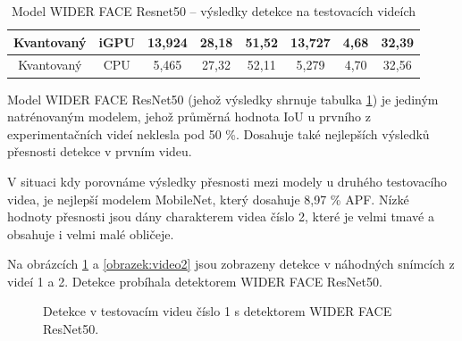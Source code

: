 \begin{table}[H]
\begin{tabular}{cc|ccc|ccc|}
  \multicolumn{1}{|c|}{\cellcolor[HTML]{E0DBDB}Kvantovaný}     & \cellcolor[HTML]{E0DBDB}iGPU & \multicolumn{1}{c|}{13,924}                                 & \multicolumn{1}{c|}{28,18}                                  & 51,52          & \multicolumn{1}{c|}{13,727}                                 & \multicolumn{1}{c|}{4,68}                                   & 32,39          \\ \hline
  \multicolumn{1}{|c|}{\cellcolor[HTML]{E0DBDB}Kvantovaný}     & \cellcolor[HTML]{E0DBDB}CPU  & \multicolumn{1}{c|}{5,465}                                  & \multicolumn{1}{c|}{27,32}                                  & 52,11          & \multicolumn{1}{c|}{5,279}                                  & \multicolumn{1}{c|}{4,70}                                   & 32,56          \\ \hline
  \end{tabular}
  \label{tabulka:wfrvidea}
  \caption{Model WIDER FACE Resnet50 -- výsledky detekce na testovacích videích}
\end{table}

Model WIDER FACE ResNet50 (jehož výsledky shrnuje tabulka \ref{tabulka:wfrvidea}) je jediným natrénovaným modelem, jehož průměrná hodnota IoU u prvního z experimentačních videí neklesla pod 50 \%. Dosahuje také nejlepších výsledků přesnosti detekce v prvním videu. 

V situaci kdy porovnáme výsledky přesnosti mezi modely u druhého testovacího videa, je nejlepší modelem MobileNet, který dosahuje 8,97 \% APF. Nízké hodnoty přesnosti jsou dány charakterem videa číslo 2, které je velmi tmavé a obsahuje i velmi malé obličeje.

Na obrázcích \ref{obrazek:video1} a \ref{obrazek:video2} jsou zobrazeny detekce v náhodných snímcích z videí 1 a 2. Detekce probíhala detektorem WIDER FACE ResNet50.

\begin{figure}[H] 
  \begin{center}
  \label{obrazek:video1}
  \caption{Detekce v testovacím videu číslo 1 s detektorem WIDER FACE ResNet50.}
  \end{center}
\end{figure}

